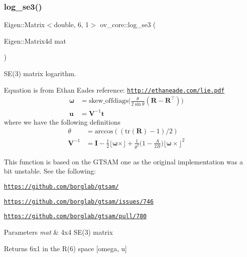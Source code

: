 \subsubsection{\texorpdfstring{log\+\_\+se3()}{log\_se3()}}
{\footnotesize\ttfamily Eigen\+::\+Matrix$<$double, 6, 1$>$ ov\+\_\+core\+::log\+\_\+se3 (\begin{DoxyParamCaption}\item[{Eigen\+::\+Matrix4d}]{mat }\end{DoxyParamCaption})\hspace{0.3cm}{\ttfamily [inline]}}



S\+E(3) matrix logarithm. 

Equation is from Ethan Eade\textquotesingle{}s reference\+: \href{http://ethaneade.com/lie.pdf}{\tt http\+://ethaneade.\+com/lie.\+pdf} \begin{align*} \boldsymbol\omega &=\mathrm{skew\_offdiags}\Big(\frac{\theta}{2\sin\theta}(\mathbf R - \mathbf R^\top)\Big) \\ \mathbf u &= \mathbf V^{-1}\mathbf t \end{align*} where we have the following definitions \begin{align*} \theta &= \mathrm{arccos}((\mathrm{tr}(\mathbf R)-1)/2) \\ \mathbf V^{-1} &= \mathbf I - \frac{1}{2} \lfloor \boldsymbol\omega \times\rfloor + \frac{1}{\theta^2}\Big(1-\frac{A}{2B}\Big)\lfloor \boldsymbol\omega \times\rfloor^2 \end{align*}

This function is based on the G\+T\+S\+AM one as the original implementation was a bit unstable. See the following\+:
\begin{DoxyItemize}
\item \href{https://github.com/borglab/gtsam/}{\tt https\+://github.\+com/borglab/gtsam/}
\item \href{https://github.com/borglab/gtsam/issues/746}{\tt https\+://github.\+com/borglab/gtsam/issues/746}
\item \href{https://github.com/borglab/gtsam/pull/780}{\tt https\+://github.\+com/borglab/gtsam/pull/780}
\end{DoxyItemize}


\begin{DoxyParams}{Parameters}
{\em mat} & 4x4 S\+E(3) matrix \\
\hline
\end{DoxyParams}
\begin{DoxyReturn}{Returns}
6x1 in the R(6) space \mbox{[}omega, u\mbox{]} 
\end{DoxyReturn}
\mbox{\label{namespaceov__core_a1bbbcb3ed59aa7dff7883c2e8644d9fb}} 
